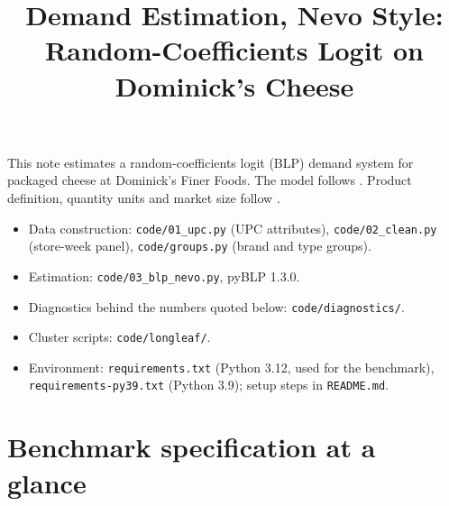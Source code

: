 \documentclass[11pt]{article}
\title{Demand Estimation, Nevo Style:\\Random-Coefficients Logit on Dominick's Cheese}
\author{}
\date{}
\newcommand{\code}[1]{\texttt{#1}}
\begin{document}
\maketitle

This note estimates a random-coefficients logit (BLP) demand system for packaged cheese at
Dominick's Finer Foods. The model follows \citet{nevo2000}. Product definition, quantity units
and market size follow \citet{mw2017}.

\begin{itemize}
  \item Data construction: \code{code/01\_upc.py} (UPC attributes), \code{code/02\_clean.py}
        (store-week panel), \code{code/groups.py} (brand and type groups).
  \item Estimation: \code{code/03\_blp\_nevo.py}, pyBLP 1.3.0.
  \item Diagnostics behind the numbers quoted below: \code{code/diagnostics/}.
  \item Cluster scripts: \code{code/longleaf/}.
  \item Environment: \code{requirements.txt} (Python 3.12, used for the benchmark),
        \code{requirements-py39.txt} (Python 3.9); setup steps in \code{README.md}.
\end{itemize}

\section{Benchmark specification at a glance}\label{sec:glance}
\end{document}
